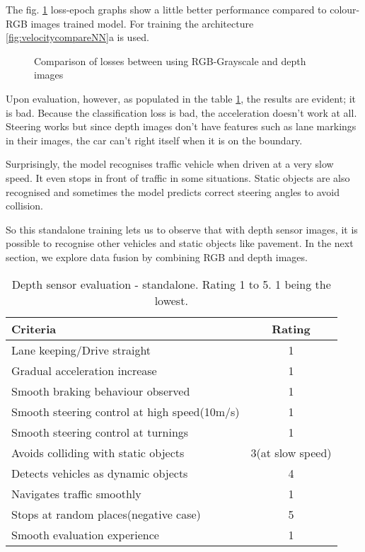 The fig. \ref{fig:colourvsdepth1} loss-epoch graphs show a little better performance compared to
colour-RGB images trained model. For training the architecture
\ref{fig:velocitycompareNN}a is used.
\begin{figure}[!ht]
    \centering
    \def\svgwidth{\textwidth}
    \caption{Comparison of losses between using RGB-Grayscale and depth images}
    \label{fig:colourvsdepth1}
\end{figure}
Upon evaluation, however, as populated in the table \ref{table:depthsensorstandalone},
the results are evident; it is bad. Because the classification loss is bad, the
acceleration doesn't work at all. Steering works but since depth images don't have
features such as lane markings in their images, the car can't right itself when it is on
the boundary.

Surprisingly, the model recognises traffic vehicle when driven at a very slow speed. It
even stops in front of traffic in some situations. Static objects are also recognised and
sometimes the model predicts correct steering angles to avoid collision.

So this standalone training lets us to observe that with depth sensor images, it is
possible to recognise other vehicles and static objects like pavement. In the next
section, we explore data fusion by combining RGB and depth images.
\begin{table}[!ht]
    \centering
\begin{tabular}{lc}
    \toprule
    Criteria & Rating \\\midrule
    Lane keeping/Drive straight  & 1  \\
    Gradual acceleration increase  & 1\\
    Smooth braking behaviour observed & 1 \\
    Smooth steering control at high speed(10m/s) & 1 \\
    Smooth steering control at turnings & 1\\
    Avoids colliding with static objects & 3(at slow speed) \\
    Detects vehicles as dynamic objects & 4 \\
    Navigates traffic smoothly & 1\\
    Stops at random places(negative case) & 5 \\
    Smooth evaluation experience & 1 \\\bottomrule
\end{tabular}
\caption{Depth sensor evaluation - standalone. Rating 1 to 5. 1 being the lowest.}
\label{table:depthsensorstandalone}
\end{table}
